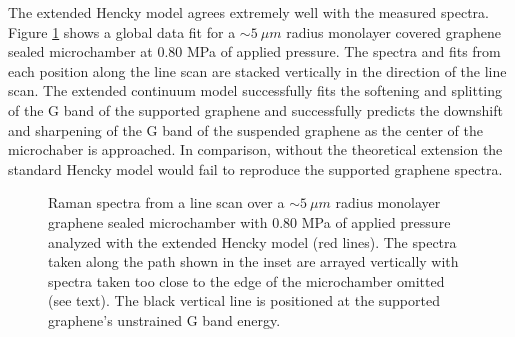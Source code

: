 The extended Hencky model agrees extremely well with the measured spectra.
Figure \ref{fig:fri:fitlinescan} shows a global data fit for a $\sim 5 \ \mu m$ radius monolayer covered graphene sealed microchamber at 0.80 MPa of applied pressure.
The spectra and fits from each position along the line scan are stacked vertically in the direction of the line scan.
The extended continuum model successfully fits the softening and splitting of the G band of the supported graphene and successfully predicts the downshift and sharpening of the G band of the suspended graphene as the center of the microchaber is approached.
In comparison, without the theoretical extension the standard Hencky model would fail to reproduce the supported graphene spectra.

\begin{figure}
	\begin{center}
	
	\end{center}
	\caption[Line scan spectra fit with the extended Hencky model]{\label{fig:fri:fitlinescan} Raman spectra from a line scan over a $\sim 5 \ \mu m$ radius monolayer graphene sealed microchamber with 0.80 MPa of applied pressure analyzed with the extended Hencky model (red lines).  The spectra taken along the path shown in the inset are arrayed vertically with spectra taken too close to the edge of the microchamber omitted (see text).  The black vertical line is positioned at the supported graphene's unstrained G band energy.}
\end{figure}

